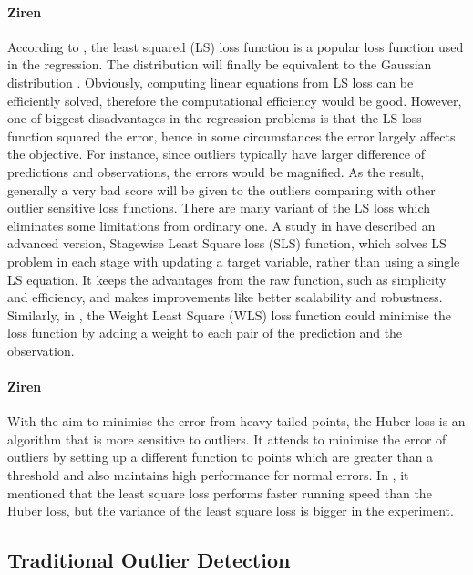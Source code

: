 \documentclass[runningheads]{llncs}
\begin{document}
\paragraph{Ziren}According to \cite{nielsen2016tree}, the least squared (LS) loss function is a popular loss function used in the regression. The distribution will finally be equivalent to the Gaussian distribution \citep{nielsen2016tree}. Obviously, computing linear equations from LS loss can be efficiently solved, therefore the computational efficiency would be good. However, one of biggest disadvantages in the regression problems is that the LS loss function squared the error, hence in some circumstances the error largely affects the objective. For instance, since outliers typically have larger difference of predictions and observations, the errors would be magnified. As the result, generally a very bad score will be given to the outliers comparing with other outlier sensitive loss functions. There are many variant of the LS loss which eliminates some limitations from ordinary one. A study in \cite{yang2008stagewise} have described an advanced version, Stagewise Least Square loss (SLS) function, which solves LS problem in each stage with updating a target variable, rather than using a single LS equation. It keeps the advantages from the raw function, such as simplicity and efficiency, and makes improvements like better scalability and robustness. Similarly, in \cite{kiers1997weighted}, the Weight Least Square (WLS) loss function could minimise the loss function by adding a weight to each pair of the prediction and the observation.

\paragraph{Ziren}With the aim to minimise the error from heavy tailed points, the Huber loss \citep{huber1964robust} is an algorithm that is more sensitive to outliers. It attends to minimise the error of outliers by setting up a different function to points which are greater than a threshold and also maintains high performance for normal errors. In \cite{rabbat2004distributed}, it mentioned that the least square loss performs faster running speed than the Huber loss, but the variance of the least square loss is bigger in the experiment.

\subsection{Traditional Outlier Detection}
\end{document}
